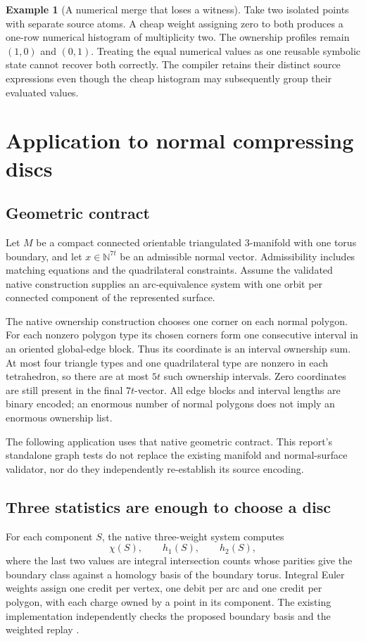 \documentclass[11pt]{article}
\theoremstyle{definition}\newtheorem{definition}[theorem]{Definition}
\newtheorem{example}[theorem]{Example}
\theoremstyle{remark}\newtheorem{remark}[theorem]{Remark}
\newcommand{\N}{\mathbb N}
\begin{document}
\begin{example}[A numerical merge that loses a witness]
Take two isolated points with separate source atoms. A cheap weight assigning
zero to both produces a one-row numerical histogram of multiplicity two. The
ownership profiles remain $(1,0)$ and $(0,1)$. Treating the equal numerical values
as one reusable symbolic state cannot recover both correctly. The compiler
retains their distinct source expressions even though the cheap histogram may
subsequently group their evaluated values.
\end{example}

\section{Application to normal compressing discs}
\label{sec:normal}

\subsection{Geometric contract}
Let $M$ be a compact connected orientable triangulated 3-manifold with one torus
boundary, and let $x\in\N^{7t}$ be an admissible normal vector. Admissibility
includes matching equations and the quadrilateral constraints. Assume the
validated native construction supplies an arc-equivalence system with one orbit
per connected component of the represented surface.

The native ownership construction chooses one corner on each normal polygon.
For each nonzero polygon type its chosen corners form one consecutive interval
in an oriented global-edge block. Thus its coordinate is an interval ownership
sum. At most four triangle types and one quadrilateral type are nonzero in each
tetrahedron, so there are at most $5t$ such ownership intervals. Zero coordinates
are still present in the final $7t$-vector. All edge blocks and interval lengths
are binary encoded; an enormous number of normal polygons does not imply an
enormous ownership list.

The following application uses that native geometric contract. This report's
standalone graph tests do not replace the existing manifold and normal-surface
validator, nor do they independently re-establish its source encoding.

\subsection{Three statistics are enough to choose a disc}
For each component $S$, the native three-weight system computes
\[
 \chi(S),\qquad h_1(S),\qquad h_2(S),
\]
where the last two values are integral intersection counts whose parities give
the boundary class against a homology basis of the boundary torus. Integral
Euler weights assign one credit per vertex, one debit per arc and one credit
per polygon, with each charge owned by a point in its component. The existing
implementation independently checks the proposed boundary basis and the
weighted replay \cite{repo}.
\end{document}
